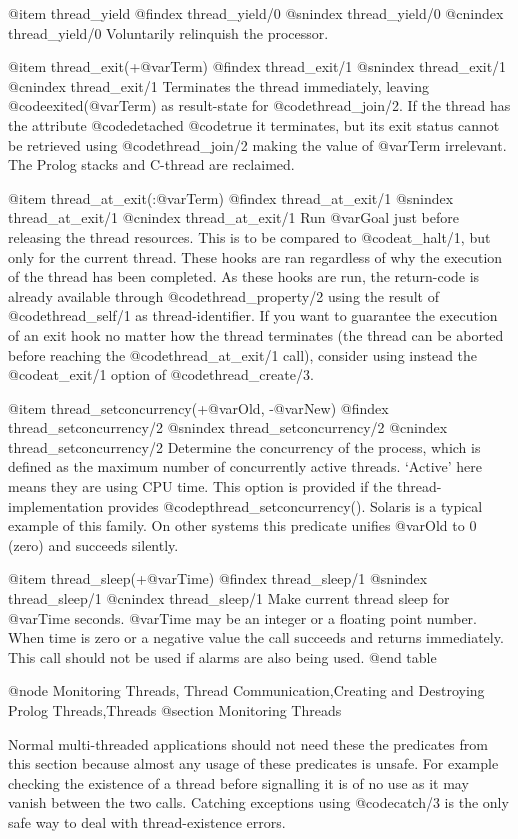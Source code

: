 {{{{{{{{{@item thread_yield
@findex thread_yield/0
@snindex thread_yield/0
@cnindex thread_yield/0
Voluntarily relinquish the processor.

@item thread_exit(+@var{Term})
@findex thread_exit/1
@snindex thread_exit/1
@cnindex thread_exit/1
Terminates the thread immediately, leaving @code{exited(@var{Term})} as
result-state for @code{thread_join/2}.  If the thread has the attribute
@code{detached} @code{true} it terminates, but its exit status cannot be
retrieved using @code{thread_join/2} making the value of @var{Term}
irrelevant.  The Prolog stacks and C-thread are reclaimed.

@item thread_at_exit(:@var{Term})
@findex thread_at_exit/1
@snindex thread_at_exit/1
@cnindex thread_at_exit/1
Run @var{Goal} just before releasing the thread resources. This is to
be compared to @code{at_halt/1}, but only for the current
thread. These hooks are ran regardless of why the execution of the
thread has been completed. As these hooks are run, the return-code is
already available through @code{thread_property/2} using the result of
@code{thread_self/1} as thread-identifier. If you want to guarantee the 
execution of an exit hook no matter how the thread terminates (the thread 
can be aborted before reaching the @code{thread_at_exit/1} call), consider
using instead the @code{at_exit/1} option of @code{thread_create/3}. 

@item thread_setconcurrency(+@var{Old}, -@var{New})
@findex thread_setconcurrency/2
@snindex thread_setconcurrency/2
@cnindex thread_setconcurrency/2
Determine the concurrency of the process, which is defined as the
maximum number of concurrently active threads. `Active' here means
they are using CPU time. This option is provided if the
thread-implementation provides
@code{pthread_setconcurrency()}. Solaris is a typical example of this
family. On other systems this predicate unifies @var{Old} to 0 (zero)
and succeeds silently.

@item thread_sleep(+@var{Time})
@findex thread_sleep/1
@snindex thread_sleep/1
@cnindex thread_sleep/1
Make current thread sleep for @var{Time} seconds. @var{Time} may be an
integer or a floating point number. When time is zero or a negative value 
the call succeeds and returns immediately. This call should not be used if
alarms are also being used.
@end table


@node Monitoring Threads, Thread Communication,Creating and Destroying Prolog Threads,Threads
@section Monitoring Threads

Normal multi-threaded applications should not need these the predicates
from this section because almost any usage of these predicates is
unsafe. For example checking the existence of a thread before signalling
it is of no use as it may vanish between the two calls. Catching
exceptions using @code{catch/3} is the only safe way to deal with
thread-existence errors.

}}}}}}}}}
